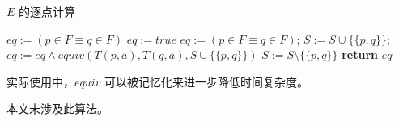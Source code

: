 \begin{algorithm}
    \caption{$E$ 的逐点计算}\label{al:4-9}
    \small
    \begin{algorithmic}[1]
                $ eq := ( p \in F \equiv q \in F ) $
                $eq := true$
                \State $ eq := ( p \in F \equiv q \in F ) $;
                \State $S:=S \cup \{  \{ p,q \} \}$;
                    \State $eq:= eq \land equiv ( T(p,a),T(q,a),S\cup \{ \{ p,q\} \}  ) $
                \EndFor
                \State $S:=S \setminus \{  \{ p,q \} \}$
            \EndIf
            \State \textbf{return} $eq$
        \EndFunction
    \end{algorithmic}
\end{algorithm}

\newpage
实际使用中，$equiv$ 可以被记忆化来进一步降低时间复杂度。

本文未涉及此算法。


